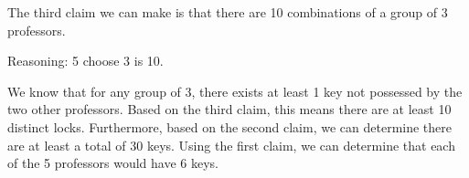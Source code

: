 \documentclass{article}
\begin{document}
The third claim we can make is that there are 10 combinations of a group of 3 professors.

Reasoning: 5 choose 3 is 10.

We know that for any group of 3, there exists at least 1 key not possessed by the two other professors. Based on the third claim, this means there are at least 10 distinct locks. Furthermore, based on the second claim, we can determine there are at least a total of 30 keys. Using the first claim, we can determine that each of the 5 professors would have 6 keys.
\end{document}
